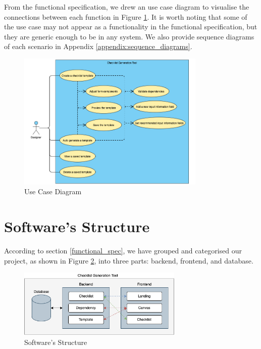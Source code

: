 From the functional specification, we drew an use case diagram to visualise the connections between each function in Figure \ref{fig:use_case_diagram}. It is worth noting that some of the use case may not appear as a functionality in the functional specification, but they are generic enough to be in any system. We also provide sequence diagrams of each scenario in Appendix \ref{appendix:sequence_diagrams}.

\begin{figure}[ht!]
    \centering
    \includegraphics[width=0.8\textwidth]{overleaf/images/use_case_diagram.png}
    \caption{Use Case Diagram}
    \label{fig:use_case_diagram}
\end{figure}



\section{Software's Structure}
\label{design:software_structure}
According to section \ref{functional_spec}, we have grouped and categorised our project, as shown in Figure \ref{fig:software_structure}, into three parts: backend, frontend, and database.

\begin{figure}
    \centering
    \includegraphics[width=0.7\textwidth]{overleaf/images/software_structure.png}
    \caption{Software's Structure}
    \label{fig:software_structure}
\end{figure}

